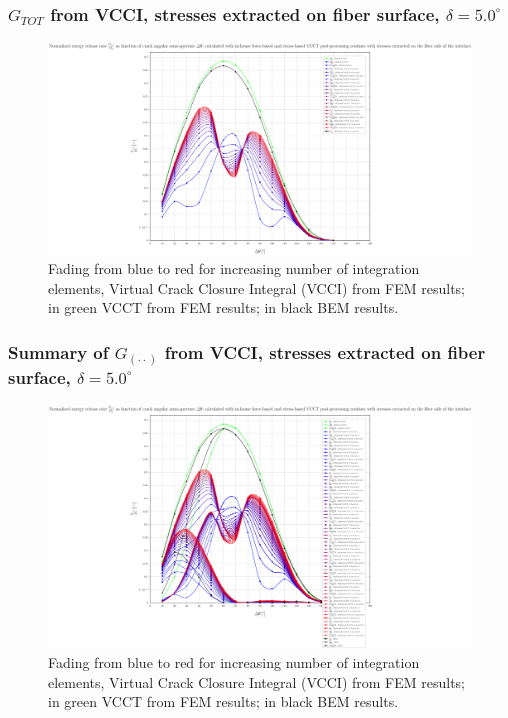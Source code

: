 \begin{frame}
\frametitle{\small $G_{TOT}$ from VCCI, stresses extracted on fiber surface, $\delta=5.0^{\circ}$}
\vspace{-0.5cm}
\centering
\captionsetup[figure]{font=scriptsize,labelfont=scriptsize}
\begin{figure}[!h]
\centering
\includegraphics[height=0.7\textheight]{2017-07-25_AbqRunSummary_SmallStrain_D05/pdf/2017-07-25_AbqRunSummary_SmallStrain_D05_F-SoF-VCCT_GTOT.pdf}
  \caption{\scriptsize Fading from blue to red for increasing number of integration elements, Virtual Crack Closure Integral (VCCI) from FEM results; in green VCCT from FEM results; in black BEM results.}
  \label{fig:res1}
\end{figure}
\end{frame}
\begin{frame}
\frametitle{\small Summary of $G_{\left(\cdot\cdot\right)}$ from VCCI, stresses extracted on fiber surface, $\delta=5.0^{\circ}$}
\vspace{-0.5cm}
\centering
\captionsetup[figure]{font=scriptsize,labelfont=scriptsize}
\begin{figure}[!h]
\centering
\includegraphics[height=0.7\textheight]{2017-07-25_AbqRunSummary_SmallStrain_D05/pdf/2017-07-25_AbqRunSummary_SmallStrain_D05_F-SoF-VCCT_Summary.pdf}
  \caption{\scriptsize Fading from blue to red for increasing number of integration elements, Virtual Crack Closure Integral (VCCI) from FEM results; in green VCCT from FEM results; in black BEM results.}
  \label{fig:res1}
\end{figure}
\end{frame}
